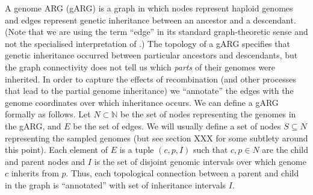 \documentclass{article}
\begin{document}
A genome ARG (gARG) is a graph in which nodes represent
haploid genomes and edges represent
genetic inheritance between an ancestor and a descendant.
(Note that we are using the term ``edge'' in its standard
graph-theoretic sense
and not the specialised interpretation of
\cite{shipilina2023origin}.)
The topology of a gARG specifies that genetic inheritance
occurred between particular
ancestors and descendants, but the graph connectivity
does not tell us which \emph{parts} of their genomes were inherited.
In order to capture the effects of recombination
(and other processes that lead to the partial genome inheritance)
 we ``annotate'' the edges with the genome
coordinates over which inheritance occurs.
We can define a gARG formally as follows.
Let $N \subset \mathbb{N}$ be the set of nodes representing
the genomes in the gARG, and $E$ be the set of edges.
We will usually define a set of nodes $S \subseteq N$
representing the sampled genomes
(but see section XXX for some subtlety around this point).
Each element of $E$ is a tuple $(c, p, I)$ such that $c, p \in N$ are the child and
parent nodes and $I$ is the set of disjoint genomic intervals
over
which genome $c$ inherits from $p$. Thus, each topological connection between
 a parent and child in the graph is ``annotated'' with set of
inheritance intervals $I$.
\end{document}
